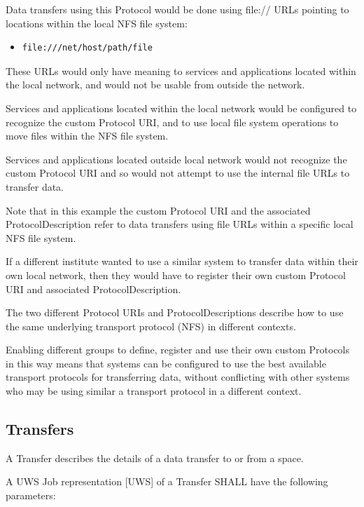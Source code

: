 \documentclass[11pt,a4paper]{ivoa}
\begin{document}
Data transfers using this Protocol would be done using file:// URLs pointing to locations within the local NFS file system:

\begin{itemize}
    \item \begin{verbatim}file:///net/host/path/file\end{verbatim}
\end{itemize}

These URLs would only have meaning to services and applications located within the local network, and would not be usable from outside the network.

Services and applications located within the local network would be configured to recognize the custom Protocol URI, and to use local file system operations to move files within the NFS file system.

Services and applications located outside local network would not recognize the custom Protocol URI and so would not attempt to use the internal file URLs to transfer data.

Note that in this example the custom Protocol URI and the associated ProtocolDescription refer to data transfers using file URLs within a specific local NFS file system.

If a different institute wanted to use a similar system to transfer data within their own local network, then they would have to register their own custom Protocol URI and associated ProtocolDescription.

The two different Protocol URIs and ProtocolDescriptions describe how to use the same underlying transport protocol (NFS) in different contexts.

Enabling different groups to define, register and use their own custom Protocols in this way means that systems can be configured to use the best available transport protocols for transferring data, without conflicting with other systems who may be using similar a transport protocol in a different context.

\subsection{Transfers}
A Transfer describes the details of a data transfer to or from a space.

A UWS Job representation [UWS] of a Transfer SHALL have the following parameters:
\end{document}
